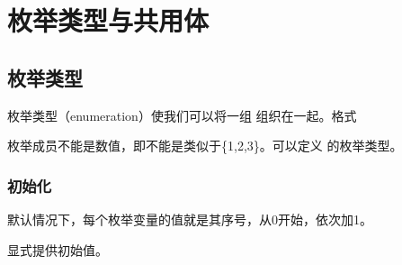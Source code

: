 \documentclass[letterpaper,10pt,english]{sphinxmanual}
\begin{document}
\section{枚举类型与共用体}
\label{\detokenize{cpp/17_enumUnion::doc}}\label{\detokenize{cpp/17_enumUnion:id1}}

\subsection{枚举类型}
\label{\detokenize{cpp/17_enumUnion:id2}}
枚举类型（enumeration）使我们可以将一组  组织在一起。格式

%
\begin{sphinxVerbatim}[commandchars=\\\{\}]
  
\end{sphinxVerbatim}

枚举成员不能是数值，即不能是类似于\{1,2,3\}。可以定义  的枚举类型。


\subsubsection{初始化}
\label{\detokenize{cpp/17_enumUnion:id3}}
默认情况下，每个枚举变量的值就是其序号，从0开始，依次加1。

%
\begin{sphinxVerbatim}[commandchars=\\\{\}]
        
\end{sphinxVerbatim}

显式提供初始值。

%
\begin{sphinxVerbatim}[commandchars=\\\{\}]
        
\end{sphinxVerbatim}
\end{document}
